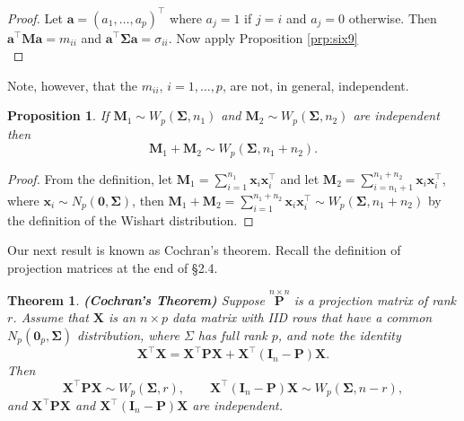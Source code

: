 \documentclass[]{book}
\newtheorem{theorem}{Theorem}[chapter]
\newtheorem{proposition}{Proposition}[chapter]
\theoremstyle{definition}
\theoremstyle{definition}
\theoremstyle{definition}
\theoremstyle{remark}
\begin{document}
\begin{proof}
{}Let \(\boldsymbol a= (a_1,\ldots,a_p)^\top\) where \(a_j = 1\) if \(j=i\) and \(a_j = 0\) otherwise. Then \(\boldsymbol a^\top \boldsymbol M\boldsymbol a= m_{ii}\) and \(\boldsymbol a^\top \boldsymbol \Sigma\boldsymbol a= \sigma_{ii}\). Now apply Proposition \ref{prp:six9}\\
\end{proof}

Note, however, that the \(m_{ii}\), \(i=1,\ldots,p\), are not, in general, independent.

\begin{proposition}
\protect\hypertarget{prp:six10}{}{\label{prp:six10} }If \(\boldsymbol M_1 \sim W_p(\boldsymbol \Sigma,n_1)\) and \(\boldsymbol M_2 \sim W_p(\boldsymbol \Sigma,n_2)\) are independent
then
\[\boldsymbol M_1 + \boldsymbol M_2 \sim W_p(\boldsymbol \Sigma,n_1 + n_2).\]
\end{proposition}

\begin{proof}
{}From the definition, let \(\boldsymbol M_1 = \sum_{i=1}^{n_1} \boldsymbol x_i \boldsymbol x_i^\top\) and let \(\boldsymbol M_2 = \sum_{i=n_1+1}^{n_1+n_2} \boldsymbol x_i \boldsymbol x_i^\top\), where \(\boldsymbol x_i \sim N_p(\boldsymbol 0,\boldsymbol \Sigma)\), then \(\boldsymbol M_1+\boldsymbol M_2 = \sum_{i=1}^{n_1+n_2} \boldsymbol x_i \boldsymbol x_i^\top \sim W_p(\boldsymbol \Sigma,n_1 + n_2)\) by the definition of the Wishart distribution.
\end{proof}

Our next result is known as Cochran's theorem. Recall the definition of projection matrices at the end of \S 2.4.

\begin{theorem}
\protect\hypertarget{thm:six11}{}{\label{thm:six11} }\textbf{(Cochran's Theorem)} Suppose \(\stackrel{n \times n}{\mathbf P}\) is a projection matrix of rank \(r\). Assume that \(\boldsymbol X\) is an \(n \times p\) data matrix with IID rows that have a common \(N_p({\mathbf 0}_p, \boldsymbol \Sigma)\) distribution, where \(\Sigma\) has full rank \(p\), and note the identity
\begin{equation}
\boldsymbol X^\top \boldsymbol X= \boldsymbol X^\top {\mathbf P} \boldsymbol X+ \boldsymbol X^\top ({\mathbf I}_n -{\mathbf P})\boldsymbol X.
\label{eq:Cochran1}
\end{equation}
Then
\begin{equation}
\boldsymbol X^\top {\mathbf P} \boldsymbol X\sim W_p(\boldsymbol \Sigma, r), \qquad  \boldsymbol X^\top ({\mathbf I}_n -{\mathbf P})\boldsymbol X\sim W_p(\boldsymbol \Sigma, n-r),
\label{eq:Cochran2}
\end{equation}
and \(\boldsymbol X^\top {\mathbf P} \boldsymbol X\) and \(\boldsymbol X^\top ({\mathbf I}_n -{\mathbf P})\boldsymbol X\)
are independent.
\end{theorem}
\end{document}
